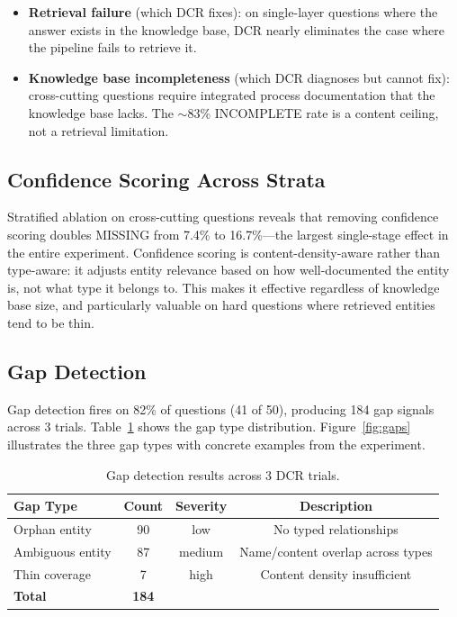 \documentclass[11pt,a4paper]{article}
\begin{document}
\begin{itemize}[nosep]
  \item \textbf{Retrieval failure} (which DCR fixes): on single-layer questions where the answer exists in the knowledge base, DCR nearly eliminates the case where the pipeline fails to retrieve it.
  \item \textbf{Knowledge base incompleteness} (which DCR diagnoses but cannot fix): cross-cutting questions require integrated process documentation that the knowledge base lacks. The $\sim$83\% INCOMPLETE rate is a content ceiling, not a retrieval limitation.
\end{itemize}

\subsection{Confidence Scoring Across Strata}

Stratified ablation on cross-cutting questions reveals that removing confidence scoring doubles MISSING from 7.4\% to 16.7\%---the largest single-stage effect in the entire experiment. Confidence scoring is content-density-aware rather than type-aware: it adjusts entity relevance based on how well-documented the entity is, not what type it belongs to. This makes it effective regardless of knowledge base size, and particularly valuable on hard questions where retrieved entities tend to be thin.

\subsection{Gap Detection}
\label{sec:gaps}

Gap detection fires on 82\% of questions (41 of 50), producing 184 gap signals across 3 trials. Table~\ref{tab:gaps} shows the gap type distribution. Figure~\ref{fig:gaps} illustrates the three gap types with concrete examples from the experiment.

\begin{table}[h]
\centering
\caption{Gap detection results across 3 DCR trials.}
\label{tab:gaps}
\begin{tabular}{@{}lccc@{}}
\toprule
Gap Type & Count & Severity & Description \\
\midrule
Orphan entity & 90 & low & No typed relationships \\
Ambiguous entity & 87 & medium & Name/content overlap across types \\
Thin coverage & 7 & high & Content density insufficient \\
\midrule
\textbf{Total} & \textbf{184} & & \\
\bottomrule
\end{tabular}
\end{table}
\end{document}
